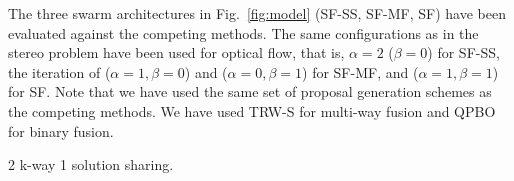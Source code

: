 \noindent
The three swarm architectures in Fig.~\ref{fig:model} (SF-SS, SF-MF, SF)
have been evaluated against the competing methods. The same
configurations as in the stereo problem have been used for optical flow,
that is, $\alpha=2$ ($\beta=0$) for SF-SS, the iteration of
($\alpha=1, \beta=0$) and ($\alpha=0, \beta=1$) for SF-MF, and
($\alpha=1, \beta=1$) for SF.
%
Note that we have used the same set of proposal generation schemes as
the competing methods. We have used TRW-S for multi-way fusion and QPBO
for binary fusion.
%

2 k-way 1 solution sharing.
